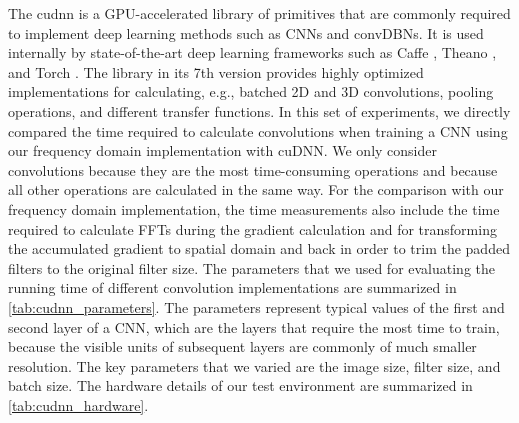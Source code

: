The \gls{cudnn} \citep{chetlur2014} is a GPU-accelerated library of primitives
that are commonly required to implement deep learning methods such as CNNs and
convDBNs. It is used internally by state-of-the-art deep learning frameworks
such as Caffe \citep{jia2014}, Theano \citep{bastien2012}, and Torch
\citep{collobert2011torch7}. The library in its 7th version provides highly
optimized implementations for calculating, e.g., batched 2D and 3D convolutions,
pooling operations, and different transfer functions. In this set of
experiments, we directly compared the time required to calculate convolutions
when training a CNN using our frequency domain implementation with cuDNN. We
only consider convolutions because they are the most time-consuming operations
and because all other operations are calculated in the same way. For the
comparison with our frequency domain implementation, the time measurements also
include the time required to calculate FFTs during the gradient calculation and
for transforming the accumulated gradient to spatial domain and back in order to
trim the padded filters to the original filter size. The parameters that we used
for evaluating the running time of different convolution implementations are
summarized in \ref{tab:cudnn_parameters}. The parameters represent typical
values of the first and second layer of a CNN, which are the layers that require
the most time to train, because the visible units of subsequent layers are
commonly of much smaller resolution. The key parameters that we varied are the
image size, filter size, and batch size. The hardware details of our test
environment are summarized in \ref{tab:cudnn_hardware}.



